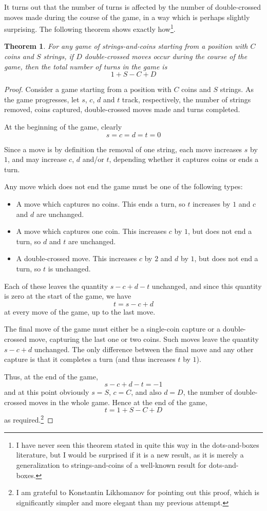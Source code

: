 \documentclass[a4paper,twocolumn]{article}
\newtheorem{gamelength}[thm]{Theorem}
\begin{document}
It turns out that the number of turns is affected by the number of
double-crossed moves made during the course of the game, in a way
which is perhaps slightly surprising. The following theorem shows
exactly how\footnote{I have never seen this theorem stated in quite
  this way in the dots-and-boxes literature, but I would be surprised
  if it is a new result, as it is merely a generalization to
  strings-and-coins of a well-known result for dots-and-boxes.}.

\begin{gamelength}\label{gamelength}
  For any game of strings-and-coins starting from a position with $C$
  coins and $S$ strings, if $D$ double-crossed moves occur during
  the course of the game, then the total number of turns in the game
  is $$1 + S - C + D$$
\end{gamelength}
\begin{proof}
  Consider a game starting from a position with $C$ coins and $S$
  strings. As the game progresses, let $s$, $c$, $d$ and $t$ track,
  respectively, the number of strings removed, coins captured,
  double-crossed moves made and turns completed.

  At the beginning of the game, clearly $$s = c = d = t = 0$$

  Since a move is by definition the removal of one string, each move
  increases $s$ by $1$, and may increase $c$, $d$ and/or $t$,
  depending whether it captures coins or ends a turn.

  Any move which does not end the game must be one of the following
  types:

  \begin{itemize}
    \item A move which captures no coins. This ends a turn, so $t$
      increases by $1$ and $c$ and $d$ are unchanged.
    \item A move which captures one coin. This increases $c$ by $1$,
      but does not end a turn, so $d$ and $t$ are unchanged.
    \item A double-crossed move. This increases $c$ by $2$ and $d$ by
      $1$, but does not end a turn, so $t$ is unchanged.
  \end{itemize}

  Each of these leaves the quantity $s - c + d - t$ unchanged, and
  since this quantity is zero at the start of the game, we have $$t =
  s - c + d$$ at every move of the game, up to the last move.

  The final move of the game must either be a single-coin capture or a
  double-crossed move, capturing the last one or two coins. Such moves
  leave the quantity $s - c + d$ unchanged. The only difference
  between the final move and any other capture is that it completes a
  turn (and thus increases $t$ by $1$).

  Thus, at the end of the game, $$s - c + d - t = -1$$ and at this
  point obviously $s = S$, $c = C$, and also $d = D$, the number of
  double-crossed moves in the whole game. Hence at the end of the
  game, $$t = 1 + S - C + D$$ as required.\footnote{I am grateful to
    Konstantin Likhomanov for pointing out this proof, which is
    significantly simpler and more elegant than my previous attempt.}
\end{proof}
\end{document}
